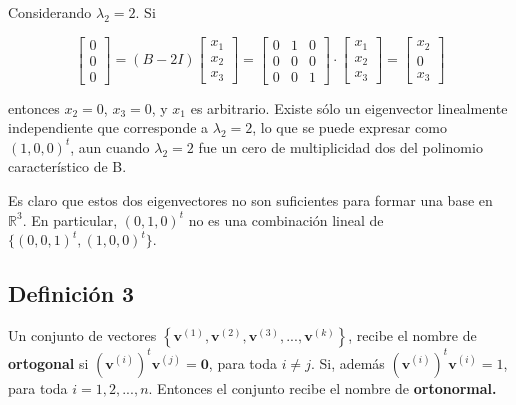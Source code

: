 \documentclass[12pt, a4paper]{article}
\numberwithin{subsection}{section} %
\begin{document}
            Considerando $\lambda_2 = 2$. Si
        
            \begin{equation*}
                \begin{bmatrix}
                    0 \\ 0 \\ 0
                \end{bmatrix} = (B - 2I)
                \begin{bmatrix}
                    x_1 \\ x_2 \\ x_3
                \end{bmatrix} =
                \begin{bmatrix}
                    0 & 1 & 0 \\
                    0 & 0 & 0 \\
                    0 & 0 & 1
                \end{bmatrix}  \cdot 
                \begin{bmatrix}
                    x_1 \\ x_2 \\ x_3
                \end{bmatrix} =
                \begin{bmatrix}
                    x_2 \\ 0 \\ x_3
                \end{bmatrix}
            \end{equation*}
            
            entonces $x_2 = 0$, $x_3 = 0$, y $x_1$ es arbitrario. Existe sólo un eigenvector linealmente independiente que corresponde a $\lambda_2 = 2$, lo que se puede expresar como $(1, 0, 0)^t$, aun cuando $\lambda_2 = 2$ fue un cero de multiplicidad dos del polinomio característico de B.
        
            Es claro que estos dos eigenvectores no son suficientes para formar una base en $\mathbb{R}^3$. En particular, $(0, 1, 0)^t$ no es una combinación lineal de $\{(0, 0, 1)^t, (1, 0, 0)^t\}$.
        
        \subsection{\textnormal{Definición 3}}
        
        Un conjunto de vectores $\left\{ \textbf{v}^{\left( 1 \right)}, \textbf{v}^{\left( 2 \right)}, \textbf{v}^{\left( 3 \right)}, ..., \textbf{v}^{\left( k \right)} \right\}$, recibe el nombre de \textbf{ortogonal} si $\left( \textbf{v}^{\left( i \right)} \right)^{t}\textbf{v}^{\left( j \right)} = \textbf{0}$, para toda $i\neq j$. Si, además $\left( \textbf{v}^{\left( i \right)} \right)^{t}\textbf{v}^{\left( i \right)} = 1$, para toda $i = 1, 2, ..., n$. Entonces el conjunto recibe el nombre de \textbf{ortonormal.}
        
\end{document}
